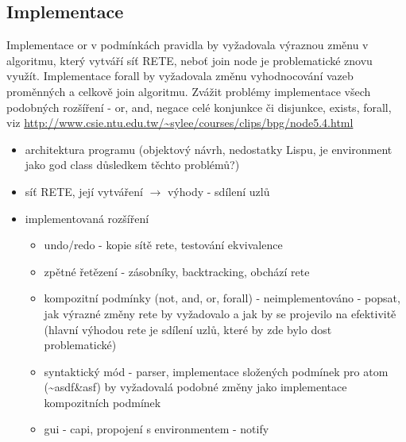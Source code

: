\subsection{Implementace}
\begin{framed}
Implementace or v podmínkách pravidla by vyžadovala výraznou změnu v algoritmu,
který vytváří síť RETE, neboť join node je problematické znovu využít.
Implementace forall by vyžadovala změnu vyhodnocování vazeb proměnných a celkově
join algoritmu. Zvážit problémy implementace všech podobných rozšíření - or,
and, negace celé konjunkce či disjunkce, exists, forall, viz
\url{http://www.csie.ntu.edu.tw/~sylee/courses/clips/bpg/node5.4.html}
\end{framed}

\begin{framed}
  \begin{itemize}
    \item architektura programu (objektový návrh, nedostatky Lispu, je
      environment jako god class důsledkem těchto problémů?)
    \item síť RETE, její vytváření $\rightarrow$ výhody - sdílení uzlů
    \item implementovaná rozšíření
    \begin{itemize}
      \item undo/redo - kopie sítě rete, testování ekvivalence
      \item zpětné řetězení - zásobníky, backtracking, obchází rete
      \item kompozitní podmínky (not, and, or, forall) - neimplementováno -
        popsat, jak výrazné změny rete by vyžadovalo a jak by se projevilo na
        efektivitě (hlavní výhodou rete je sdílení uzlů, které by zde bylo dost
        problematické)
      \item syntaktický mód - parser, implementace složených podmínek pro atom
        (\~{}asdf\&asf) by vyžadovalá podobné změny jako implementace kompozitních
        podmínek
      \item gui - capi, propojení s environmentem - notify
    \end{itemize}
  \end{itemize}
\end{framed}
